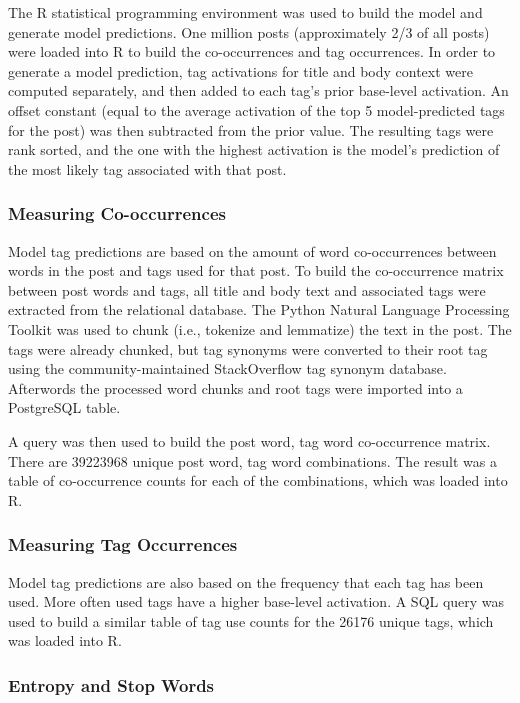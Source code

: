 \documentclass[10pt,letterpaper]{article}
\begin{document}
The R statistical programming environment was used to build the model and generate model predictions.
One million posts (approximately 2/3 of all posts) were loaded into R to build the co-occurrences and tag occurrences.
In order to generate a model prediction, tag activations for title and body context were computed separately, and then added to each tag's prior base-level activation.
An offset constant (equal to the average activation of the top 5 model-predicted tags for the post) was then subtracted from the prior value.
The resulting tags were rank sorted, and the one with the highest activation is the model's prediction of the most likely tag associated with that post.

\subsubsection{Measuring Co-occurrences}

Model tag predictions are based on the amount of word co-occurrences between words in the post and tags used for that post.
To build the co-occurrence matrix between post words and tags, all title and body text and associated tags were extracted from the relational database.
The Python Natural Language Processing Toolkit \cite{Bird2009} was used to chunk (i.e., tokenize and lemmatize) the text in the post.
The tags were already chunked, but tag synonyms were converted to their root tag using the community-maintained StackOverflow tag synonym database.
Afterwords the processed word chunks and root tags were imported into a PostgreSQL table.

A query was then used to build the post word, tag word co-occurrence matrix.
There are \num{39223968} unique post word, tag word combinations.
The result was a table of co-occurrence counts for each of the combinations, which was loaded into R.

\subsubsection{Measuring Tag Occurrences}

Model tag predictions are also based on the frequency that each tag has been used.
More often used tags have a higher base-level activation.
A SQL query was used to build a similar table of tag use counts for the \num{26176} unique tags, which was loaded into R.

\subsubsection{Entropy and Stop Words}
\end{document}

